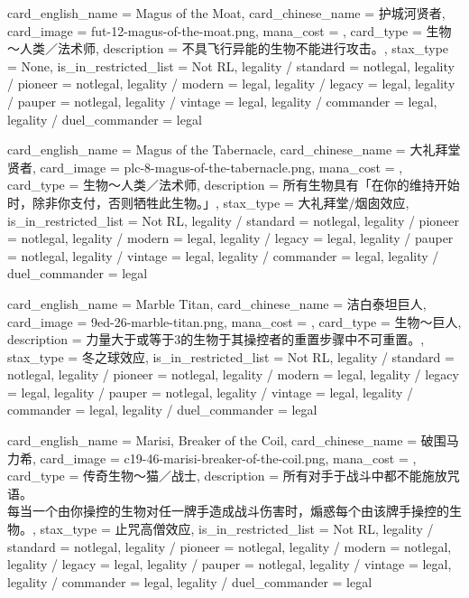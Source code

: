 \documentclass[lang = cn, color = black, 10pt]{AllThatStax}
\begin{document}
\card
{
	card_english_name = {Magus of the Moat},
	card_chinese_name = {护城河贤者},
	card_image = fut-12-magus-of-the-moat.png,
	mana_cost = ,
	card_type = 生物～人类／法术师,
	description = {不具飞行异能的生物不能进行攻击。},
	stax_type = None,
	is_in_restricted_list = Not RL,
	legality / standard = notlegal,
	legality / pioneer = notlegal,
	legality / modern = legal,
	legality / legacy = legal,
	legality / pauper = notlegal,
	legality / vintage = legal,
	legality / commander = legal,
	legality / duel_commander = legal
}

\card
{
	card_english_name = {Magus of the Tabernacle},
	card_chinese_name = {大礼拜堂贤者},
	card_image = plc-8-magus-of-the-tabernacle.png,
	mana_cost = ,
	card_type = 生物～人类／法术师,
	description = {所有生物具有「在你的维持开始时，除非你支付，否则牺牲此生物。」},
	stax_type = 大礼拜堂/烟囱效应,
	is_in_restricted_list = Not RL,
	legality / standard = notlegal,
	legality / pioneer = notlegal,
	legality / modern = legal,
	legality / legacy = legal,
	legality / pauper = notlegal,
	legality / vintage = legal,
	legality / commander = legal,
	legality / duel_commander = legal
}

\card
{
	card_english_name = {Marble Titan},
	card_chinese_name = {洁白泰坦巨人},
	card_image = 9ed-26-marble-titan.png,
	mana_cost = ,
	card_type = 生物～巨人,
	description = {力量大于或等于3的生物于其操控者的重置步骤中不可重置。},
	stax_type = 冬之球效应,
	is_in_restricted_list = Not RL,
	legality / standard = notlegal,
	legality / pioneer = notlegal,
	legality / modern = legal,
	legality / legacy = legal,
	legality / pauper = notlegal,
	legality / vintage = legal,
	legality / commander = legal,
	legality / duel_commander = legal
}

\card
{
	card_english_name = {Marisi, Breaker of the Coil},
	card_chinese_name = {破围马力希},
	card_image = c19-46-marisi-breaker-of-the-coil.png,
	mana_cost = ,
	card_type = 传奇生物～猫／战士,
	description = {所有对手于战斗中都不能施放咒语。\\
每当一个由你操控的生物对任一牌手造成战斗伤害时，煽惑每个由该牌手操控的生物。},
	stax_type = 止咒高僧效应,
	is_in_restricted_list = Not RL,
	legality / standard = notlegal,
	legality / pioneer = notlegal,
	legality / modern = notlegal,
	legality / legacy = legal,
	legality / pauper = notlegal,
	legality / vintage = legal,
	legality / commander = legal,
	legality / duel_commander = legal
}
\end{document}
